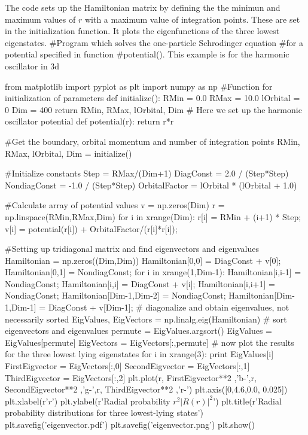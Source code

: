 \documentclass[%
twoside,                 %
final,                   %
10pt]{article}
\begin{document}
\noindent
The code sets up the Hamiltonian matrix by defining the the minimun and maximum values of $r$ with a
maximum value of integration points.  These are set in the initialization function. It plots the 
eigenfunctions of the three lowest eigenstates.
\bpypro
#Program which solves the one-particle Schrodinger equation 
#for a potential specified in function
#potential(). This example is for the harmonic oscillator in 3d

from  matplotlib import pyplot as plt
import numpy as np
#Function for initialization of parameters
def initialize():
    RMin = 0.0
    RMax = 10.0
    lOrbital = 0
    Dim = 400
    return RMin, RMax, lOrbital, Dim
# Here we set up the harmonic oscillator potential
def potential(r):
    return r*r

#Get the boundary, orbital momentum and number of integration points
RMin, RMax, lOrbital, Dim = initialize()

#Initialize constants
Step    = RMax/(Dim+1)
DiagConst = 2.0 / (Step*Step)
NondiagConst =  -1.0 / (Step*Step)
OrbitalFactor = lOrbital * (lOrbital + 1.0)

#Calculate array of potential values
v = np.zeros(Dim)
r = np.linspace(RMin,RMax,Dim)
for i in xrange(Dim):
    r[i] = RMin + (i+1) * Step;
    v[i] = potential(r[i]) + OrbitalFactor/(r[i]*r[i]);

#Setting up tridiagonal matrix and find eigenvectors and eigenvalues
Hamiltonian = np.zeros((Dim,Dim))
Hamiltonian[0,0] = DiagConst + v[0];
Hamiltonian[0,1] = NondiagConst;
for i in xrange(1,Dim-1):
    Hamiltonian[i,i-1]  = NondiagConst;
    Hamiltonian[i,i]    = DiagConst + v[i];
    Hamiltonian[i,i+1]  = NondiagConst;
Hamiltonian[Dim-1,Dim-2] = NondiagConst;
Hamiltonian[Dim-1,Dim-1] = DiagConst + v[Dim-1];
# diagonalize and obtain eigenvalues, not necessarily sorted
EigValues, EigVectors = np.linalg.eig(Hamiltonian)
# sort eigenvectors and eigenvalues
permute = EigValues.argsort()
EigValues = EigValues[permute]
EigVectors = EigVectors[:,permute]
# now plot the results for the three lowest lying eigenstates
for i in xrange(3):
    print EigValues[i]
FirstEigvector = EigVectors[:,0]
SecondEigvector = EigVectors[:,1]
ThirdEigvector = EigVectors[:,2]
plt.plot(r, FirstEigvector**2 ,'b-',r, SecondEigvector**2 ,'g-',r, ThirdEigvector**2 ,'r-')
plt.axis([0,4.6,0.0, 0.025])
plt.xlabel(r'$r$')
plt.ylabel(r'Radial probability $r^2|R(r)|^2$')
plt.title(r'Radial probability distributions for three lowest-lying states')
plt.savefig('eigenvector.pdf')
plt.savefig('eigenvector.png')
plt.show()
\end{document}
